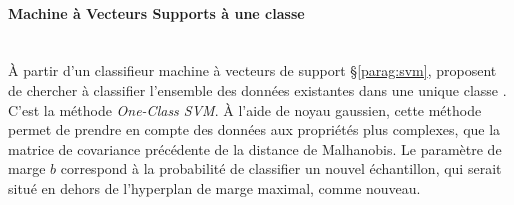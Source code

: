 \paragraph{Machine à Vecteurs Supports à une classe}\mbox{} \\
À partir d'un classifieur machine à vecteurs de support §\ref{parag:svm}, \citeauthor{scholkopf_support_1999} proposent de chercher à classifier l'ensemble des données existantes dans une unique classe \cite{scholkopf_support_1999, scholkopf_estimating_2001}.
C'est la méthode \textit{One-Class SVM}.
À l'aide de noyau gaussien, cette méthode permet de prendre en compte des données aux propriétés plus complexes, que la matrice de covariance précédente de la distance de Malhanobis.
Le paramètre de marge $b$ correspond à la probabilité de classifier un nouvel échantillon, qui serait situé en dehors de l'hyperplan de marge maximal, comme nouveau.

%

%

